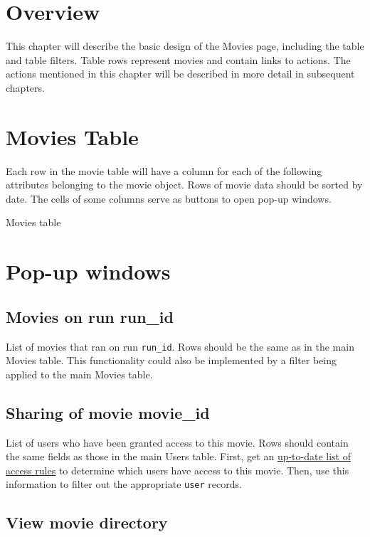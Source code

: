 
\section{Overview}

This chapter will describe the basic design of the Movies page, including the table and
table filters. Table rows represent movies and contain links to actions. The actions 
mentioned in this chapter will be described in more detail in subsequent chapters.

\section{Movies Table}
Each row in the movie table will have a column for each of the following attributes
belonging to the movie object. Rows of movie data should be sorted by date. The 
cells of some columns serve as buttons to open pop-up windows.

\begin{table}[h]
    
    \caption{Movies table}
\end{table}

\section{Pop-up windows}

\subsection{Movies on run run\_id}
List of movies that ran on run \texttt{run\_id}. Rows should be the same as in the main 
Movies table. This functionality could also be implemented by a filter being applied 
to the main Movies table.

\subsection{Sharing of movie movie\_id}
List of users who have been granted access to this movie. Rows should contain the 
same fields as those in the main Users table. First, get an 
\hyperref[section:updatingcollectionaccessrules]{up-to-date list of access rules} 
to determine which users have access to this movie. Then, use this information 
to filter out the appropriate \texttt{user} records.

\subsection{View movie directory}

